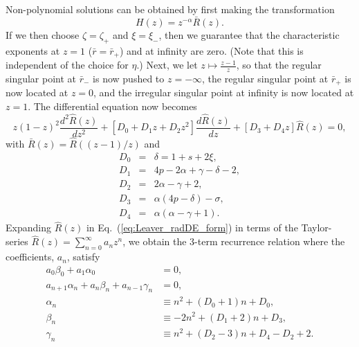 \documentclass[11pt]{article}
\begin{document}
\vspace{0.25in}
Non-polynomial solutions can be obtained by first making the transformation
\begin{equation}
  H(z) = z^{-\alpha}\bar{R}(z).
\end{equation}
If we then choose $\zeta=\zeta_+$ and $\xi=\xi_\minus$, then we
guarantee that the characteristic exponents at $z=1$
($\bar{r}=\bar{r}_+$) and at infinity are zero.  (Note that this is
independent of the choice for $\eta$.)  Next, we let
$z\mapsto\frac{z-1}{z}$, so that the regular singular point at
$\bar{r}_\minus$ is now pushed to $z=-\infty$, the regular singular
point at $\bar{r}_+$ is now located at $z=0$, and the irregular
singular point at infinity is now located at $z=1$.  The differential
equation now becomes
\begin{equation}\label{eq:Leaver_radDE_form}
  z(1-z)^2\frac{d^2\hat{R}(z)}{dz^2} 
     + \left[D_0 + D_1z + D_2z^2\right]\frac{d\hat{R}(z)}{dz} 
     + \left[D_3 + D_4z\right]\hat{R}(z) = 0,
\end{equation}
with $\bar{R}(z)=\hat{R}((z-1)/z)$ and
\begin{eqnarray}
  D_0 &=& \delta = 1+s+2\xi, \\
  D_1 &=& 4p-2\alpha+\gamma-\delta-2, \\
  D_2 &=& 2\alpha-\gamma+2, \\
  D_3 &=& \alpha(4p-\delta)-\sigma, \\
  D_4 &=& \alpha(\alpha-\gamma+1).
\end{eqnarray}
Expanding $\hat{R}(z)$ in Eq.~(\ref{eq:Leaver_radDE_form}) in terms of
the Taylor-series $\hat{R}(z)=\sum_{n=0}^\infty{a_nz^n}$, we obtain
the 3-term recurrence relation where the coefficients, $a_n$, satisfy
\begin{align}\label{eq:Leaver_rad_2-term}
  a_0\beta_0 + a_1\alpha_0 &= 0, \\ \label{eq:Leaver_rad_3-term}
  a_{n+1}\alpha_n + a_n\beta_n + a_{n-1}\gamma_n &=0, \\
  \alpha_n &\equiv n^2 + (D_0+1)n + D_0, \\
  \beta_n &\equiv -2n^2 + (D_1+2)n + D_3, \\
  \gamma_n &\equiv n^2 + (D_2-3)n +D_4 - D_2 +2.
\end{align}
\end{document}
